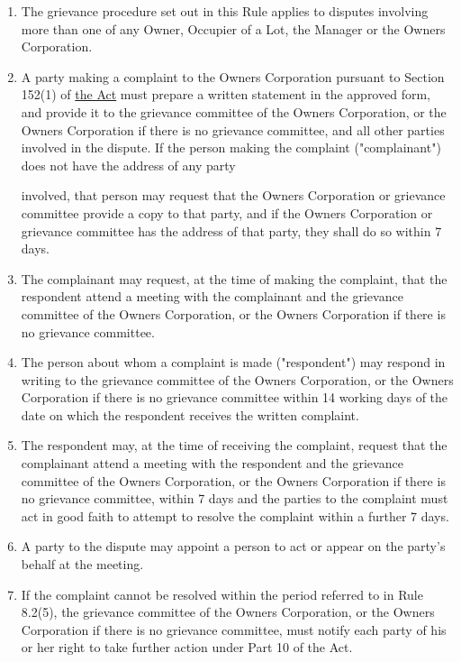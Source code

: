 \documentclass{article}
\begin{document}
\begin{enumerate}[label=\arabic*.]
\begin{enumerate}[label=\arabic{enumi}.\arabic*.]
\begin{enumerate}[label=(\arabic*)]
\item  The grievance procedure set out in this Rule applies to disputes involving more than one of any Owner, Occupier of a Lot, the Manager or the Owners Corporation.

\item  A party making a complaint to the Owners Corporation pursuant to Section 152(1) of \href{https://www.legislation.vic.gov.au/in-force/acts/owners-corporations-act-2006/021}{the Act} must prepare a written statement in the approved form, and provide it to the grievance committee of the Owners Corporation, or the Owners Corporation if there is no grievance committee, and all other parties involved in the dispute. If the person making the complaint ("complainant") does not have the address of any party
\newpage

involved, that person may request that the Owners Corporation or grievance committee provide a copy to that party, and if the Owners Corporation or grievance committee has the address of that party, they shall do so within 7 days.

\item  The complainant may request, at the time of making the complaint, that the respondent attend a meeting with the complainant and the grievance committee of the Owners Corporation, or the Owners Corporation if there is no grievance committee.

\item  The person about whom a complaint is made ("respondent") may respond in writing to the grievance committee of the Owners Corporation, or the Owners Corporation if there is no grievance committee within 14 working days of the date on which the respondent receives the written complaint.

\item  The respondent may, at the time of receiving the complaint, request that the complainant attend a meeting with the respondent and the grievance committee of the Owners Corporation, or the Owners Corporation if there is no grievance committee, within 7 days and the parties to the complaint must act in good faith to attempt to resolve the complaint within a further 7 days.

\item  A party to the dispute may appoint a person to act or appear on the party’s behalf at the meeting.

\item  If the complaint cannot be resolved within the period referred to in Rule 8.2(5), the grievance committee of the Owners Corporation, or the Owners Corporation if there is no grievance committee, must notify each party of his or her right to take further action under Part 10 of the Act.


\end{enumerate}
\end{enumerate}
\end{enumerate}
\end{document}
